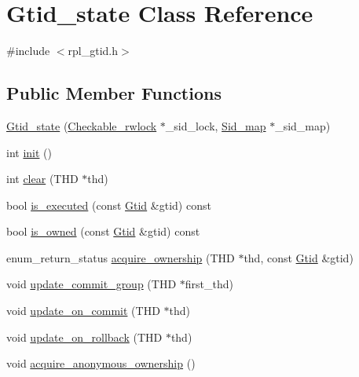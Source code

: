 \hypertarget{classGtid__state}{}\section{Gtid\+\_\+state Class Reference}
\label{classGtid__state}


{\ttfamily \#include $<$rpl\+\_\+gtid.\+h$>$}

\subsection*{Public Member Functions}
\begin{DoxyCompactItemize}
\item 
\mbox{\hyperlink{classGtid__state_a4e93b5ffa97a101e51aa722cf5f56ef3}{Gtid\+\_\+state}} (\mbox{\hyperlink{classCheckable__rwlock}{Checkable\+\_\+rwlock}} $\ast$\+\_\+sid\+\_\+lock, \mbox{\hyperlink{classSid__map}{Sid\+\_\+map}} $\ast$\+\_\+sid\+\_\+map)
\item 
int \mbox{\hyperlink{classGtid__state_a05bbafc9331c90395789157153fd3601}{init}} ()
\item 
int \mbox{\hyperlink{classGtid__state_ad923504d43e3b912ab1aaad9bb65a8b7}{clear}} (T\+HD $\ast$thd)
\item 
bool \mbox{\hyperlink{classGtid__state_aa85f3475832c5bab63b37c8f7fd65300}{is\+\_\+executed}} (const \mbox{\hyperlink{structGtid}{Gtid}} \&gtid) const
\item 
bool \mbox{\hyperlink{classGtid__state_aa4a0e22e395f095aad358b1db91e170a}{is\+\_\+owned}} (const \mbox{\hyperlink{structGtid}{Gtid}} \&gtid) const
\item 
enum\+\_\+return\+\_\+status \mbox{\hyperlink{classGtid__state_a3bedc53a5eed5898822ede2a9d5214d6}{acquire\+\_\+ownership}} (T\+HD $\ast$thd, const \mbox{\hyperlink{structGtid}{Gtid}} \&gtid)
\item 
void \mbox{\hyperlink{classGtid__state_a9fa3ed5a9b5fc7d0a4ad5492b657b790}{update\+\_\+commit\+\_\+group}} (T\+HD $\ast$first\+\_\+thd)
\item 
void \mbox{\hyperlink{classGtid__state_adc4c103d1209489a7b7e0d179d654faf}{update\+\_\+on\+\_\+commit}} (T\+HD $\ast$thd)
\item 
void \mbox{\hyperlink{classGtid__state_a82dacb8e665689ad80e4541cea325897}{update\+\_\+on\+\_\+rollback}} (T\+HD $\ast$thd)
\item 
void \mbox{\hyperlink{classGtid__state_a7e259736e00e4fa5835ec9cdd34dc0ba}{acquire\+\_\+anonymous\+\_\+ownership}} ()
\item 

\end{DoxyCompactItemize}
